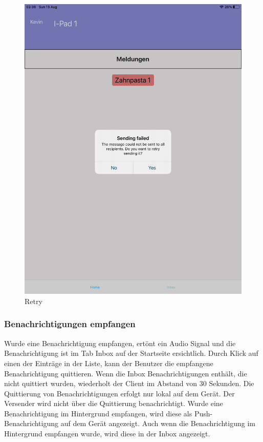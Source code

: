 \begin{figure}[h]
\begin{minipage}[b]{0.4\textwidth}
        \includegraphics[width=\textwidth]{graphics/screenshots/mobileclient/screenshot-retry}
        \caption{Retry}
    \end{minipage}
    \label{fig:MobileClient-Screens2}
\end{figure}

\clearpage

\subsubsection*{Benachrichtigungen empfangen}

Wurde eine Benachrichtigung empfangen, ertönt ein Audio Signal und die Benachrichtigung ist im Tab Inbox auf der Startseite ersichtlich.
Durch Klick auf einen der Einträge in der Liste, kann der Benutzer die empfangene Benachrichtigung quittieren.
Wenn die Inbox Benachrichtigungen enthält, die nicht quittiert wurden, wiederholt der Client im Abstand von 30 Sekunden.
Die Quittierung von Benachrichtigungen erfolgt nur lokal auf dem Gerät.
Der Versender wird nicht über die Quittierung benachrichtigt.
Wurde eine Benachrichtigung im Hintergrund empfangen, wird diese als Push-Benachrichtigung auf dem Gerät angezeigt.
Auch wenn die Benachrichtigung im Hintergrund empfangen wurde, wird diese in der Inbox angezeigt.

